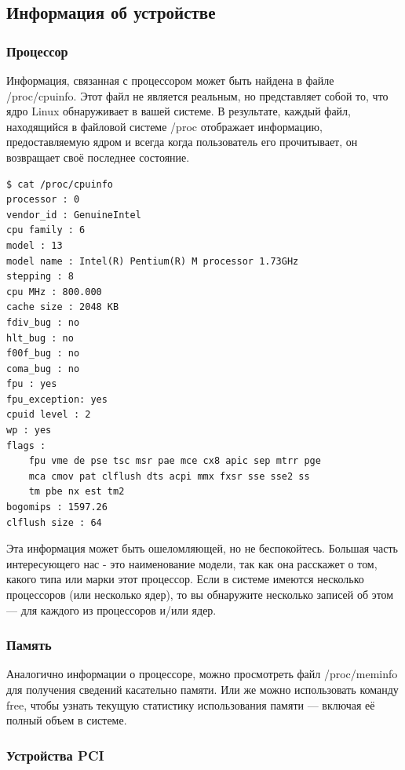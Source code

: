 \documentclass[10pt]{book}
\begin{document}
\subsection{Информация об устройстве}

\subsubsection{Процессор}
Информация, связанная с процессором может быть найдена в файле /proc/cpuinfo. Этот файл не является реальным, но представляет собой то, что ядро Linux обнаруживает в вашей системе. В результате, каждый файл, находящийся в файловой системе /proc отображает информацию, предоставляемую ядром и всегда когда пользователь его прочитывает, он возвращает своё последнее состояние. 

\vspace{3mm}
\begin{tcolorbox}
\begin{lstlisting}
$ cat /proc/cpuinfo
processor : 0
vendor_id : GenuineIntel
cpu family : 6
model : 13
model name : Intel(R) Pentium(R) M processor 1.73GHz
stepping : 8
cpu MHz : 800.000
cache size : 2048 KB
fdiv_bug : no
hlt_bug : no
f00f_bug : no
coma_bug : no
fpu : yes
fpu_exception: yes
cpuid level : 2
wp : yes
flags :
	fpu vme de pse tsc msr pae mce cx8 apic sep mtrr pge
	mca cmov pat clflush dts acpi mmx fxsr sse sse2 ss
	tm pbe nx est tm2
bogomips : 1597.26
clflush size : 64
\end{lstlisting}
\end{tcolorbox}

Эта информация может быть ошеломляющей, но не беспокойтесь. Большая часть интересующего нас - это наименование модели, так как она расскажет о том, какого типа или марки этот процессор. Если в системе имеются несколько процессоров (или несколько ядер), то вы обнаружите несколько записей об этом — для каждого из процессоров и/или ядер.

\subsubsection{Память}

Аналогично информации о процессоре, можно просмотреть файл /proc/meminfo для получения сведений касательно памяти. Или же можно использовать команду free, чтобы узнать текущую статистику использования памяти — включая её полный объем  в системе. 

\subsubsection{Устройства PCI}
\end{document}
